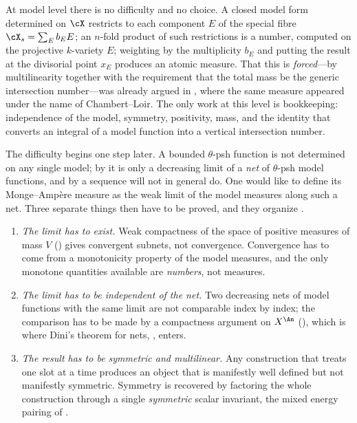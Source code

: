 At model level there is no difficulty and no choice.  A closed model form
determined on \(\cX\) restricts to each component \(E\) of the special fibre
\(\cX_s=\sum_Eb_EE\); an \(n\)-fold product of such restrictions is a number,
computed on the projective \(k\)-variety \(E\); weighting by the multiplicity
\(b_E\) and putting the result at the divisorial point \(x_E\) produces an
atomic measure.  That this is \emph{forced}---by multilinearity together with
the requirement that the total mass be the generic intersection
number---was already argued in , where the same
measure appeared under the name of Chambert--Loir.  The only work at this
level is bookkeeping: independence of the model, symmetry, positivity, mass,
and the identity that converts an integral of a model function into a
vertical intersection number.

The difficulty begins one step later.  A bounded \(\theta\)-psh function is
not determined on any single model; by
 it is only a decreasing limit of a
\emph{net} of \(\theta\)-psh model functions, and by
 a sequence will not in general do.  One
would like to define its Monge--Amp\`ere measure as the weak limit of the
model measures along such a net.  Three separate things then have to be
proved, and they organize .

\begin{enumerate}
\item\label{itm:ch24-plan:exists}
 \emph{The limit has to exist.}  Weak compactness of the space of positive
 measures of mass \(V\) () gives convergent
 subnets, not convergence.  Convergence has to come from a monotonicity
 property of the model measures, and the only monotone quantities available
 are \emph{numbers}, not measures.
\item\label{itm:ch24-plan:unique}
 \emph{The limit has to be independent of the net.}  Two decreasing nets of
 model functions with the same limit are not comparable index by index; the
 comparison has to be made by a compactness argument on \(X^{\An}\)
 (), which is where Dini's theorem for nets,
 , enters.
\item\label{itm:ch24-plan:symmetric}
 \emph{The result has to be symmetric and multilinear.}  Any construction
 that treats one slot at a time produces an object that is manifestly
 well defined but not manifestly symmetric.  Symmetry is recovered by
 factoring the whole construction through a single \emph{symmetric} scalar
 invariant, the mixed energy pairing of .
\end{enumerate}

